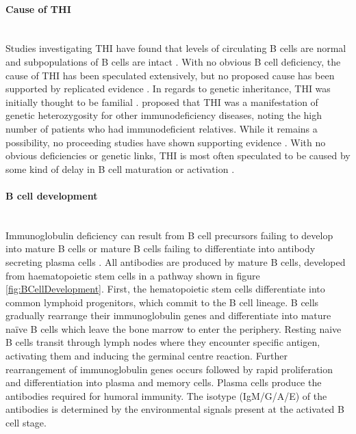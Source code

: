 \documentclass[12pt]{article}
\newcommand{\naive}{na\"{i}ve }
\begin{document}
		\paragraph{Cause of THI} 
			~\\
			Studies investigating THI have found that levels of circulating B cells are normal and subpopulations of B cells are intact \citep{Tiller78,Stiemh80,Siegel81,Buckley83,Fiorilli86,Dressler89}.
			With no obvious B cell deficiency, the cause of THI has been speculated extensively, but no proposed cause has been supported by replicated evidence \citep{Fudenberg64,Rosen66,Nathenson71,Willenbockel60,Soothill68,Tiller78,Fiorilli86,Ovadia14,Siegel81,McGeady87}.
			In regards to genetic inheritance, THI was initially thought to be familial \citep{Willenbockel60}. 
			\citet{Soothill68} proposed that THI was a manifestation of genetic heterozygosity for other immunodeficiency diseases, noting the high number of patients who had immunodeficient relatives.
			While it remains a possibility, no proceeding studies have shown supporting evidence \citep{Tiller78,Fiorilli86, Ovadia14}.
			With no obvious deficiencies or genetic links, THI is most often speculated to be caused by some kind of delay in B cell maturation or activation \citep{McGeady87,Stiemh80,Walker94,Rosen84}. 
			
		\paragraph{B cell development}
			~\\
			Immunoglobulin deficiency can result from B cell precursors failing to develop into mature B cells or mature B cells failing to differentiate into antibody secreting plasma cells \citep{Fiorilli86}. 
			All antibodies are produced by mature B cells, developed from haematopoietic stem cells in a pathway shown in figure \ref{fig:BCellDevelopment}.
			First, the hematopoietic stem cells differentiate into common lymphoid progenitors, which commit to the B cell lineage.
			B cells gradually rearrange their immunoglobulin genes and differentiate into mature \naive B cells which leave the bone marrow to enter the periphery. 
			Resting naive B cells transit through lymph nodes where they encounter specific antigen, activating them and inducing the germinal centre reaction. 
			Further rearrangement of immunoglobulin genes occurs followed by rapid proliferation and differentiation into plasma and memory cells. 
			Plasma cells produce the antibodies required for humoral immunity. 
			The isotype (IgM/G/A/E) of the antibodies is determined by the environmental signals present at the activated B cell stage. 
			
\end{document}
